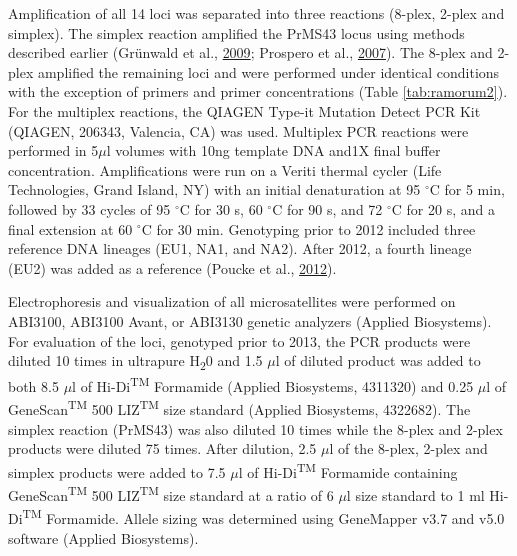\documentclass[double,12pt]{beavtex}
\begin{document}
  Amplification of all 14 loci was separated into three reactions (8-plex,
  2-plex and simplex). The simplex reaction amplified the PrMS43 locus
  using methods described earlier (Grünwald et al.,
  \protect\hyperlink{ref-grunwald2009standardizing}{2009}; Prospero et
  al., \protect\hyperlink{ref-prospero2007population}{2007}). The 8-plex
  and 2-plex amplified the remaining loci and were performed under
  identical conditions with the exception of primers and primer
  concentrations (Table \ref{tab:ramorum2}). For the multiplex reactions,
  the QIAGEN Type-it Mutation Detect PCR Kit (QIAGEN, 206343, Valencia,
  CA) was used. Multiplex PCR reactions were performed in 5\(\mu\)l
  volumes with 10ng template DNA and1X final buffer concentration.
  Amplifications were run on a Veriti thermal cycler (Life Technologies,
  Grand Island, NY) with an initial denaturation at 95 \(^{\circ}\)C for 5
  min, followed by 33 cycles of 95 \(^{\circ}\)C for 30 s, 60
  \(^{\circ}\)C for 90 s, and 72 \(^{\circ}\)C for 20 s, and a final
  extension at 60 \(^{\circ}\)C for 30 min. Genotyping prior to 2012
  included three reference DNA lineages (EU1, NA1, and NA2). After 2012, a
  fourth lineage (EU2) was added as a reference (Poucke et al.,
  \protect\hyperlink{ref-vanpoucke2012discovery}{2012}).
  
  Electrophoresis and visualization of all microsatellites were performed
  on ABI3100, ABI3100 Avant, or ABI3130 genetic analyzers (Applied
  Biosystems). For evaluation of the loci, genotyped prior to 2013, the
  PCR products were diluted 10 times in ultrapure H\textsubscript{2}0 and
  1.5 \(\mu\)l of diluted product was added to both 8.5 \(\mu\)l of
  Hi-Di\textsuperscript{TM} Formamide (Applied Biosystems, 4311320) and
  0.25 \(\mu\)l of GeneScan\textsuperscript{TM} 500
  LIZ\textsuperscript{TM} size standard (Applied Biosystems, 4322682). The
  simplex reaction (PrMS43) was also diluted 10 times while the 8-plex and
  2-plex products were diluted 75 times. After dilution, 2.5 \(\mu\)l of
  the 8-plex, 2-plex and simplex products were added to 7.5 \(\mu\)l of
  Hi-Di\textsuperscript{TM} Formamide containing
  GeneScan\textsuperscript{TM} 500 LIZ\textsuperscript{TM} size standard
  at a ratio of 6 \(\mu\)l size standard to 1 ml Hi-Di\textsuperscript{TM}
  Formamide. Allele sizing was determined using
  GeneMapper\textregistered{} v3.7 and v5.0 software (Applied Biosystems).
  
  \setcounter{figure}{0} \setcounter{table}{0}
  \renewcommand{\figurename}{Supplementary Figure}
  \renewcommand{\tablename}{Supplementary Table}
  \renewcommand{\thefigure}{\arabic{chapter}.S\arabic{figure}}
  \renewcommand{\thetable}{\arabic{chapter}.S\arabic{table}}
  
\end{document}
